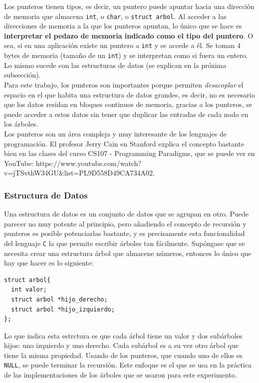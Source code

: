 \documentclass[12pt,letterpaper]{report}
\begin{document}
Los punteros tienen tipos, es decir, un puntero puede apuntar hacia una dirección de memoria que almacena \texttt{int}, o \texttt{char}, o \texttt{struct arbol}. Al acceder a las direcciones de memoria a la que los punteros apuntan, lo único que se hace es \textbf{interpretar el pedazo de memoria indicado como el tipo del puntero}. O sea, si en una aplicación existe un puntero a \texttt{int} y se accede a él. Se toman 4 bytes de memoria (tamaño de un \texttt{int}) y se interpretan como si fuera un entero. Lo mismo sucede con las estructuras de datos (se explican en la próxima subsección).\\

Para este trabajo, los punteros son importantes porque permiten \emph{desacoplar} el espacio en el que habita una estructura de datos grandes, es decir, no es necesario que los datos residan en bloques continuos de memoria, gracias a los punteros, se puede acceder a estos datos sin tener que duplicar las entradas de cada nodo en los árboles.\\

Los punteros son un área compleja y muy interesante de los lenguajes de programación. El profesor Jerry Cain en Stanford explica el concepto bastante bien en las clases del curso CS107 - Programming Paradigms, que se puede ver en YouTube: https://www.youtube.com/watch?v=jTSvthW34GU\&list=PL9D558D49CA734A02.

\subsubsection{Estructura de Datos}
Una estructura de datos es un conjunto de datos que se agrupan en otro. Puede parecer no muy potente al principio, pero añadiendo el concepto de recursión y punteros es posible potenciarlas bastante, y es precisamente esta funcionalidad del lenguaje \texttt{C} la que permite escribir árboles tan fácilmente. Supóngase que se necesita crear una estructura árbol que almacene números, entonces lo único que hay que hacer es lo siguiente:
\begin{verbatim}
struct arbol{
  int valor;
  struct arbol *hijo_derecho;
  struct arbol *hijo_izquierdo;
};
\end{verbatim}
Lo que indica esta estrctura es que cada árbol tiene un valor y dos subárboles hijos: uno izquierdo y uno derecho. Cada subárbol es a su vez otro árbol que tiene la misma propiedad. Usando de los punteros, que cuando uno de ellos es \texttt{NULL}, se puede terminar la recursión. Este enfoque es el que se usa en la práctica de las implementaciones de los árboles que se usaron para este experimento.\\
\end{document}
